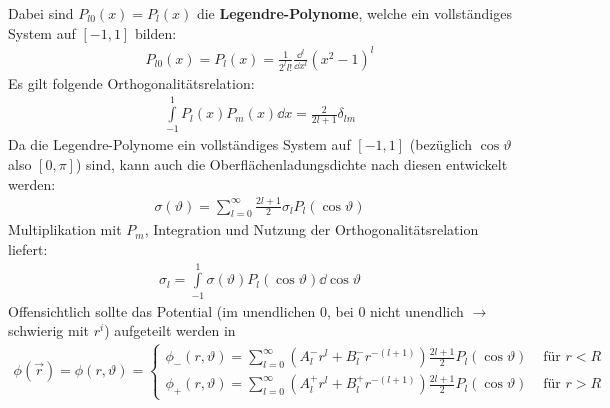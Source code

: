 		   Dabei sind $P_{l0}(x) = P_l(x)$ die \textbf{Legendre-Polynome}, welche ein vollständiges System auf $[-1,1]$ bilden:
		        \begin{equation}\begin{split}
				        P_{l0}(x) = P_l(x) = \frac{1}{2^l l!} \frac{\dd^l}{\dd x^l} (x^2-1)^l 
			        \end{split}\end{equation}
		   Es gilt folgende Orthogonalitätsrelation:
		        \begin{equation}\begin{split}
				        \int\limits_{-1}^1 P_l(x)P_m(x) \dd x = \frac{2}{2l+1} \delta_{lm}
			        \end{split}\end{equation}
		   Da die Legendre-Polynome ein vollständiges System auf $[-1,1]$ (bezüglich $\cos\vartheta$ also $[0,\pi]$) sind, kann auch die Oberflächenladungsdichte nach diesen entwickelt werden:
		        \begin{equation}\begin{split}
				        \sigma(\vartheta) = \sum_{l=0}^{\infty}  \frac{2l+1}{2} \sigma_l P_l (\cos\vartheta)
			        \end{split}\end{equation}
		   Multiplikation mit $P_m$, Integration und Nutzung der Orthogonalitätsrelation liefert:
		        \begin{equation}\begin{split}
				        \sigma_l = \int\limits_{-1}^{1} \sigma(\vartheta) P_l(\cos\vartheta) \dd \cos\vartheta
			        \end{split}\end{equation}
		   Offensichtlich sollte das Potential (im unendlichen 0, bei 0 nicht unendlich $\to$ schwierig mit $r^i$) aufgeteilt werden in
		        \begin{equation}\begin{split}
				        \phi(\vec{r} ) = \phi(r,\vartheta) = \begin{cases}
					        \phi_- (r,\vartheta) = \sum_{l=0}^{\infty} (A_{l}^- r^l+ B_{l}^- r^{-(l+1)}) \frac{2l+1}{2} P_l (\cos\vartheta) & \text{ für } r < R \\
					        \phi_+ (r,\vartheta)=\sum_{l=0}^{\infty} (A_{l}^+ r^l+ B_{l}^+ r^{-(l+1)}) \frac{2l+1}{2} P_l (\cos\vartheta)   & \text{ für } r > R
				        \end{cases}
			        \end{split}\end{equation}
